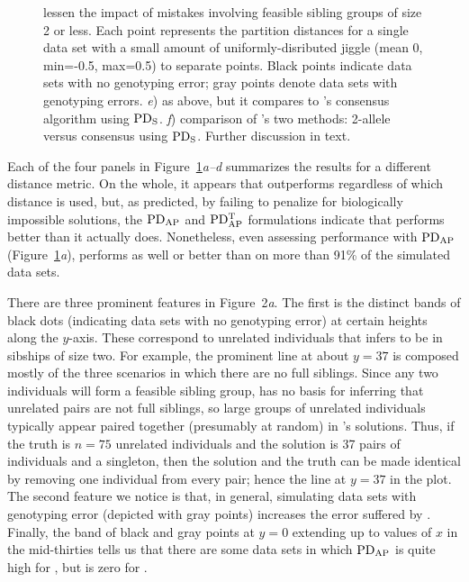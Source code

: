 \begin{figure}
{lessen the impact of mistakes involving feasible sibling groups of size 2 or less. Each point 
represents the partition distances for a single data set with a small amount of uniformly-disributed 
jiggle (mean 0, min=-0.5, max=0.5) to separate points. Black points indicate data sets with no genotyping 
error; gray points denote data sets with genotyping errors. {\em e}) as above, but it compares 
\colony{} to \kinalyzer's consensus algorithm using $\mathrm{PD_S}$.  {\em f}) comparison of \kinalyzer{}'s two 
methods: 2-allele versus consensus using $\mathrm{PD_S}$.  Further discussion in text.}
\caption[\cvksmearcaption]{\sometimes{\cvksmearcaption}}
\label{fig:cvksmear}
\end{figure}

Each of the four panels in Figure~\ref{fig:cvksmear}{\em a--d} summarizes the results for a different 
distance metric.  On the whole, it appears that \colony{} outperforms \kinalyzer{} regardless of which 
distance is used, but, as predicted, by failing to penalize for biologically impossible solutions, the 
$\mathrm{PD_{AP}}$ and $\mathrm{PD_{AP}^T}$ formulations indicate that \kinalyzer{} performs better than it actually does.   
Nonetheless, even assessing performance with $\mathrm{PD_{AP}}$ (Figure~\ref{fig:cvksmear}{\em a}), \colony{} 
performs as well or better than \kinalyzer{} on more than 91\% of the simulated data sets. 

There are three prominent features in Figure~2{\em a}.  The first is the distinct bands of black dots 
(indicating data sets with no genotyping error) at certain heights along the $y$-axis.  These 
correspond to unrelated individuals that \kinalyzer{} infers to be in sibships of size two.  For 
example, the prominent line at about $y=37$ is composed mostly of the three scenarios in which there 
are no full siblings. Since any two individuals will form a feasible sibling group, \kinalyzer{} has no 
basis for inferring that unrelated pairs are not full siblings, so large groups of unrelated 
individuals typically appear paired together (presumably at random) in \kinalyzer{}'s solutions.  Thus, 
if the truth is $n=75$ unrelated individuals and the \kinalyzer{} solution is 37 pairs of individuals 
and a singleton, then the \kinalyzer{} solution and the truth can be made identical by removing one 
individual from every pair; hence the line at $y=37$ in the plot. The second feature we notice is that, 
in general, simulating data sets with genotyping error (depicted with gray points) increases the error 
suffered by \kinalyzer{}.  Finally, the band of black and gray points at $y=0$ extending up to values 
of $x$ in the mid-thirties tells us that there are some data sets in which $\mathrm{PD_{AP}}$ is quite high for 
\colony{}, but is zero for \kinalyzer{}.  

